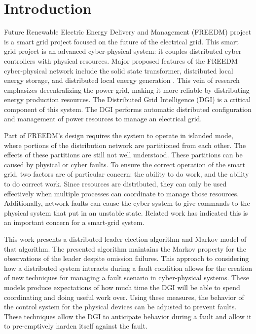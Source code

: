 
\section{Introduction}

 Future Renewable Electric Energy Delivery and Management (FREEDM) project is a smart grid project focused on the future of the electrical grid.
This smart grid project is an advanced cyber-physical system: it couples distributed cyber controllers with physical resources.
Major proposed features of the FREEDM cyber-physical network include the solid state transformer, distributed local energy storage, and distributed local energy generation \cite{FREEDMMIGRATION}.
This vein of research emphasizes decentralizing the power grid, making it more reliable by distributing energy production resources.
The Distributed Grid Intelligence (DGI) is a critical component of this system.
The DGI performs automatic distributed configuration and management of power resources to manage an electrical grid.

Part of FREEDM's design requires the system to operate in islanded mode, where portions of the distribution network are partitioned from each other.
The effects of these partitions are still not well understood.
These partitions can be caused by physical or cyber faults.
To ensure the correct operation of the smart grid, two factors are of particular concern: the ability to do work, and the ability to do correct work.
Since resources are distributed, they can only be used effectively when multiple processes can coordinate to manage those resources.
Additionally, network faults can cause the cyber system to give commands to the physical system that put in an unstable state.
Related work\cite{HARINI}\cite{TSG} has indicated this is an important concern for a smart-grid system.

This work presents a distributed leader election algorithm and Markov model of that algorithm.
The presented algorithm maintains the Markov property for the observations of the leader despite omission failures.
This approach to considering how a distributed system interacts during a fault condition allows for the creation of new techniques for managing a fault scenario in cyber-physical systems.
These models produce expectations of how much time the DGI will be able to spend coordinating and doing useful work over.
Using these measures, the behavior of the control system for the physical devices can be adjusted to prevent faults.
These techniques allow the DGI to anticipate behavior during a fault and allow it to pre-emptively harden itself against the fault.

